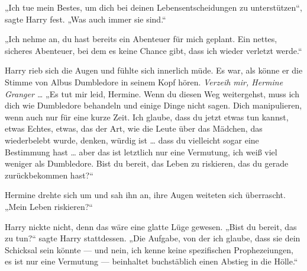 „Ich tue mein Bestes, um dich bei deinen Lebensentscheidungen zu unterstützen“, sagte Harry fest.
„Was auch immer sie sind.“

„Ich nehme an, du hast bereits ein Abenteuer für mich geplant. Ein nettes, sicheres Abenteuer, bei dem es keine Chance gibt, dass ich wieder verletzt werde.“

Harry rieb sich die Augen und fühlte sich innerlich müde. Es war, als könne er die Stimme von Albus Dumbledore in seinem Kopf hören.
\emph{Verzeih mir, Hermine Granger …}
„Es tut mir leid, Hermine. Wenn du diesen Weg weitergehst, muss ich dich wie Dumbledore behandeln und einige Dinge nicht sagen. Dich manipulieren, wenn auch nur für eine kurze Zeit. Ich glaube, dass du jetzt etwas tun kannst, etwas Echtes, etwas, das der Art, wie die Leute über das Mädchen, das wiederbelebt wurde, denken, würdig ist … dass du vielleicht sogar eine Bestimmung hast … aber das ist letztlich nur eine Vermutung, ich weiß viel weniger als Dumbledore. Bist du bereit, das Leben zu riskieren, das du gerade zurückbekommen hast?“

Hermine drehte sich um und sah ihn an, ihre Augen weiteten sich überrascht.
„Mein Leben riskieren?“

Harry nickte nicht, denn das wäre eine glatte Lüge gewesen.
„Bist du bereit, das zu tun?“ sagte Harry stattdessen.
„Die Aufgabe, von der ich glaube, dass sie dein Schicksal sein könnte — und nein, ich kenne keine spezifischen Prophezeiungen, es ist nur eine Vermutung — beinhaltet buchstäblich einen Abstieg in die Hölle.“

